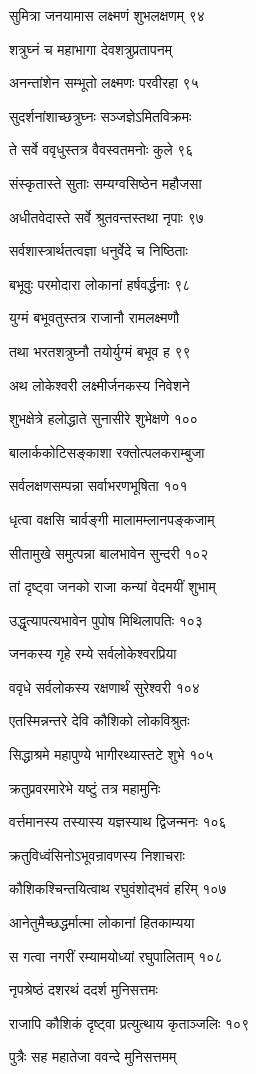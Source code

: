 सुमित्रा जनयामास लक्ष्मणं शुभलक्षणम् ९४

शत्रुघ्नं च महाभागा देवशत्रुप्रतापनम्

अनन्तांशेन सम्भूतो लक्ष्मणः परवीरहा ९५

सुदर्शनांशाच्छत्रुघ्नः सञ्जज्ञेऽमितविक्रमः

ते सर्वे ववृधुस्तत्र वैवस्वतमनोः कुले ९६

संस्कृतास्ते सुताः सम्यग्वसिष्ठेन महौजसा

अधीतवेदास्ते सर्वे श्रुतवन्तस्तथा नृपाः ९७

सर्वशास्त्रार्थतत्वज्ञा धनुर्वेदे च निष्ठिताः

बभूवुः परमोदारा लोकानां हर्षवर्द्धनाः ९८

युग्मं बभूवतुस्तत्र राजानौ रामलक्ष्मणौ

तथा भरतशत्रुघ्नौ तयोर्युग्मं बभूव ह ९९

अथ लोकेश्वरी लक्ष्मीर्जनकस्य निवेशने

शुभक्षेत्रे हलोद्धाते सुनासीरे शुभेक्षणे १००

बालार्ककोटिसङ्काशा रक्तोत्पलकराम्बुजा

सर्वलक्षणसम्पन्ना सर्वाभरणभूषिता १०१

धृत्वा वक्षसि चार्वङ्गी मालामम्लानपङ्कजाम्

सीतामुखे समुत्पन्ना बालभावेन सुन्दरी १०२

तां दृष्ट्वा जनको राजा कन्यां वेदमयीं शुभाम्

उद्धृत्यापत्यभावेन पुपोष मिथिलापतिः १०३

जनकस्य गृहे रम्ये सर्वलोकेश्वरप्रिया

ववृधे सर्वलोकस्य रक्षणार्थं सुरेश्वरी १०४

एतस्मिन्नन्तरे देवि कौशिको लोकविश्रुतः

सिद्धाश्रमे महापुण्ये भागीरथ्यास्तटे शुभे १०५

क्रतुप्रवरमारेभे यष्टुं तत्र महामुनिः

वर्त्तमानस्य तस्यास्य यज्ञस्याथ द्विजन्मनः १०६

क्रतुविध्वंसिनोऽभूवन्रावणस्य निशाचराः

कौशिकश्चिन्तयित्वाथ रघुवंशोद्भवं हरिम् १०७

आनेतुमैच्छद्धर्मात्मा लोकानां हितकाम्यया

स गत्वा नगरीं रम्यामयोध्यां रघुपालिताम् १०८

नृपश्रेष्ठं दशरथं ददर्श मुनिसत्तमः

राजापि कौशिकं दृष्ट्वा प्रत्युत्थाय कृताञ्जलिः १०९

पुत्रैः सह महातेजा ववन्दे मुनिसत्तमम्


